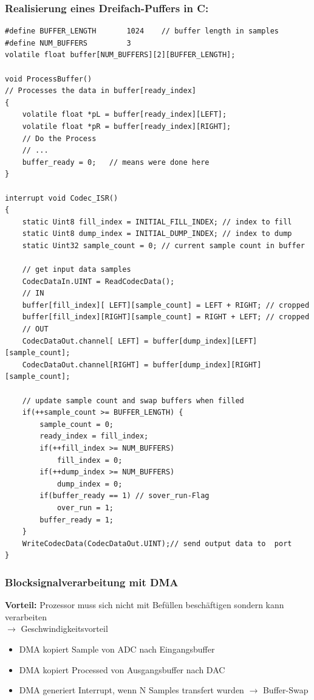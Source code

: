 \documentclass[10pt,a4paper]{article}
\begin{document}
\subsubsection{Realisierung eines Dreifach-Puffers in C:}
\begin{verbatim}
#define BUFFER_LENGTH   	1024	// buffer length in samples 
#define NUM_BUFFERS         3
volatile float buffer[NUM_BUFFERS][2][BUFFER_LENGTH];

void ProcessBuffer()
// Processes the data in buffer[ready_index]
{
    volatile float *pL = buffer[ready_index][LEFT];
    volatile float *pR = buffer[ready_index][RIGHT];
    // Do the Process
    // ...
    buffer_ready = 0;   // means were done here
}

interrupt void Codec_ISR()
{                    
    static Uint8 fill_index = INITIAL_FILL_INDEX; // index to fill
    static Uint8 dump_index = INITIAL_DUMP_INDEX; // index to dump
    static Uint32 sample_count = 0; // current sample count in buffer

    // get input data samples
  	CodecDataIn.UINT = ReadCodecData();		
  	// IN
    buffer[fill_index][ LEFT][sample_count] = LEFT + RIGHT; // cropped
    buffer[fill_index][RIGHT][sample_count] = RIGHT + LEFT; // cropped
    // OUT
    CodecDataOut.channel[ LEFT] = buffer[dump_index][LEFT][sample_count];
    CodecDataOut.channel[RIGHT] = buffer[dump_index][RIGHT][sample_count];

    // update sample count and swap buffers when filled 
    if(++sample_count >= BUFFER_LENGTH) {
        sample_count = 0;
        ready_index = fill_index;
        if(++fill_index >= NUM_BUFFERS)
            fill_index = 0;
        if(++dump_index >= NUM_BUFFERS)
            dump_index = 0;
        if(buffer_ready == 1) // sover_run-Flag
            over_run = 1;
        buffer_ready = 1;
    }
	WriteCodecData(CodecDataOut.UINT);// send output data to  port
}
\end{verbatim}

\subsubsection{Blocksignalverarbeitung mit DMA}
\textbf{Vorteil: } Prozessor muss sich nicht mit Befüllen beschäftigen sondern kann verarbeiten\\
$\rightarrow$ Geschwindigkeitsvorteil

\begin{itemize}
    \item DMA kopiert Sample von ADC nach Eingangsbuffer
    \item DMA kopiert Processed von Ausgangsbuffer nach DAC
    \item DMA generiert Interrupt, wenn N Samples transfert wurden $\rightarrow$ Buffer-Swap
\end{itemize}
\end{document}
